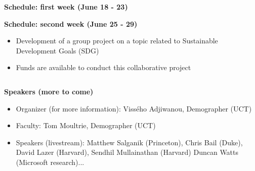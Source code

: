 \documentclass{beamer}
\begin{document}
\begin{frame}[fragile]
\begin{columns}[T]
\begin{column}{.48\textwidth}
\begin{block}{\textbf{Schedule: first week (June 18 - 23)}}
\begin{itemize}
\end{itemize}
\end{block}


\begin{block}{\textbf{Schedule: second week (June 25 - 29)}}
\begin{itemize}
\item Development of a group project on a topic related to Sustainable Development Goals (SDG)
\item Funds are available to conduct this collaborative project
\end{itemize}
\end{block}
\end{column}




\end{columns}

\begin{block}{\textbf{Speakers (more to come)}}

    


\begin{itemize}
\item Organizer (for more information): Vissého Adjiwanou, Demographer (UCT) 

\item Faculty: Tom Moultrie, Demographer (UCT)
\item Speakers (livestream): Matthew Salganik (Princeton), Chris Bail (Duke), David Lazer (Harvard), Sendhil Mullainathan (Harvard) Duncan Watts (Microsoft research)...
\end{itemize}


\end{block}


\end{frame}
\end{document}
